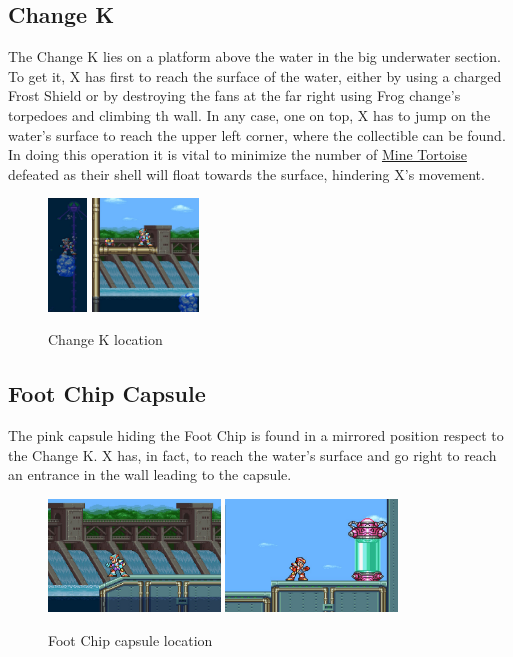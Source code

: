\subsection{Change K}
The Change K lies on a platform above the water in the big underwater section. To get it, X has first to reach the surface of the water, either by using a charged Frost Shield or by destroying the fans at the far right using Frog change's torpedoes and climbing th wall. In any case, one on top, X has to jump on the water's surface to reach the upper left corner, where the collectible can be found. In doing this operation it is vital to minimize the number of \hyperlink{enem:Mine_Tortoise}{Mine Tortoise} defeated as their shell will float towards the surface, hindering X's movement.
\begin{figure}[htp]
	\centering
	\includegraphics[height=3cm]{figures/X3/Toxic_seahorse/underwater.jpg}
	\includegraphics[height=3cm]{figures/X3/Toxic_seahorse/kanga.jpg}
	\caption{Change K location}
\end{figure}

\subsection{Foot Chip Capsule}
The pink capsule hiding the Foot Chip is found in a mirrored position respect to the Change K. X has, in fact, to reach the water's surface and go right to reach an entrance in the wall leading to the capsule.
\begin{figure}[htp]
	\centering
	\includegraphics[height=3cm]{figures/X3/Toxic_seahorse/Armor_1.png}
	\includegraphics[height=3cm]{figures/X3/Toxic_seahorse/Armor_2.png}
	\caption{Foot Chip capsule location}
\end{figure}

